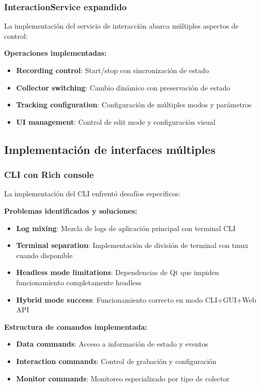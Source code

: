 \subsubsection{InteractionService expandido}

La implementación del servicio de interacción abarca múltiples aspectos de control:

\textbf{Operaciones implementadas:}
\begin{itemize}
    \item \textbf{Recording control}: Start/stop con sincronización de estado
    \item \textbf{Collector switching}: Cambio dinámico con preservación de estado
    \item \textbf{Tracking configuration}: Configuración de múltiples modos y parámetros
    \item \textbf{UI management}: Control de edit mode y configuración visual
\end{itemize}

\subsection{Implementación de interfaces múltiples}
\label{subsec:interfaces_multiples_input}

\subsubsection{CLI con Rich console}

La implementación del CLI enfrentó desafíos específicos:

\textbf{Problemas identificados y soluciones:}
\begin{itemize}
    \item \textbf{Log mixing}: Mezcla de logs de aplicación principal con terminal CLI
    \item \textbf{Terminal separation}: Implementación de división de terminal con tmux cuando disponible
    \item \textbf{Headless mode limitations}: Dependencias de Qt que impiden funcionamiento completamente headless
    \item \textbf{Hybrid mode success}: Funcionamiento correcto en modo CLI+GUI+Web API
\end{itemize}

\textbf{Estructura de comandos implementada:}
\begin{itemize}
    \item \textbf{Data commands}: Acceso a información de estado y eventos
    \item \textbf{Interaction commands}: Control de grabación y configuración
    \item \textbf{Monitor commands}: Monitoreo especializado por tipo de colector
\end{itemize}

